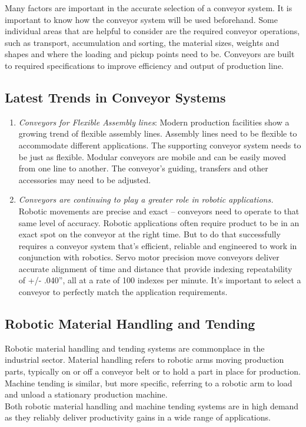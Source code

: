 \documentclass[11pt]{article}
\begin{document}
Many factors are important in the accurate selection of a conveyor system. It is important to know how the conveyor system will be used beforehand. Some individual areas that are helpful to consider are the required conveyor operations, such as transport, accumulation and sorting, the material sizes, weights and shapes and where the loading and pickup points need to be. Conveyors are built to required specifications to improve efficiency and output of production line.


\subsection{Latest Trends in Conveyor Systems}

\begin{enumerate}
	\item \textit{Conveyors for Flexible Assembly lines}: Modern production facilities show a growing trend of flexible assembly lines. Assembly lines need to be flexible to accommodate different applications. The supporting conveyor system needs to be just as flexible. Modular conveyors are mobile and can be easily moved from one line to another. The conveyor’s guiding, transfers and other accessories may need to be adjusted.
	\item \textit{Conveyors are continuing to play a greater role in robotic applications.} Robotic movements are 	precise and exact – conveyors need to operate to that same level of accuracy. Robotic applications often require product to be in an exact spot on the conveyor at the right time. But to do that successfully	requires a conveyor system that’s efficient, reliable and engineered to work in conjunction with robotics. Servo motor precision move conveyors deliver accurate alignment of time and distance that provide indexing repeatability of +/- .040”, all at a rate of 100 indexes per minute. It’s important to select a conveyor to perfectly match the application requirements.
	
\end{enumerate}

\pagebreak

\subsection{Robotic Material Handling and Tending}


Robotic material handling and tending systems are commonplace in the industrial sector. Material handling refers to robotic arms moving production parts, typically on or off a conveyor belt or to hold a part in place for production. Machine tending is similar, but more specific, referring to a robotic arm to load and unload a stationary production machine.\\
Both robotic material handling and machine tending systems are in high demand as they reliably deliver productivity gains in a wide range of applications.\\
\end{document}
